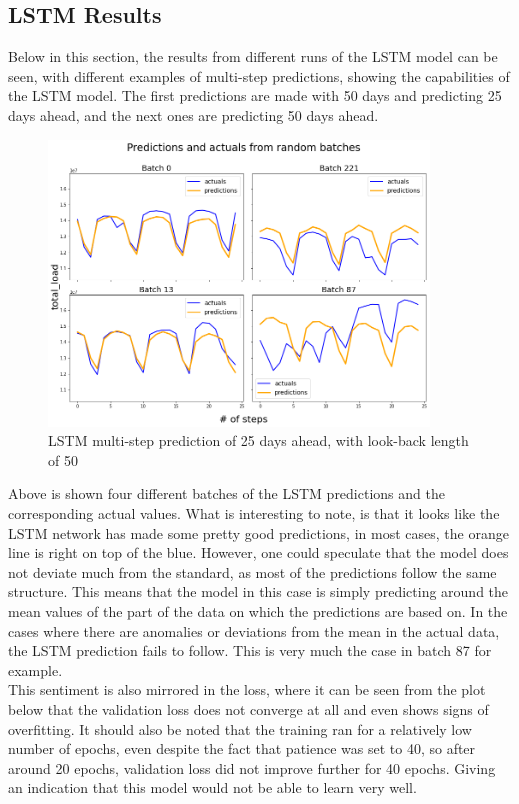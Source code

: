 \documentclass[main.tex]{subfiles}
\begin{document}
\subsection{LSTM Results}
Below in this section, the results from different runs of the LSTM model can be seen, with different examples of multi-step predictions, showing the capabilities of the LSTM model. The first predictions are made with 50 days and predicting 25 days ahead, and the next ones are predicting 50 days ahead.

\begin{figure}[H]
\centering
\includegraphics[width=0.9\textwidth]{RNNPlots/lstmpredictionsgood.png}
\caption{LSTM multi-step prediction of 25 days ahead, with look-back length of 50}
\label{fig:lstm_preds_1}
\end{figure}

Above is shown four different batches of the LSTM predictions and the corresponding actual values. What is interesting to note, is that it looks like the LSTM network has made some pretty good predictions, in most cases, the orange line is right on top of the blue. However, one could speculate that the model does not deviate much from the standard, as most of the predictions follow the same structure. This means that the model in this case is simply predicting around the mean values of the part of the data on which the predictions are based on. In the cases where there are anomalies or deviations from the mean in the actual data, the LSTM prediction fails to follow. This is very much the case in batch 87 for example.\\
This sentiment is also mirrored in the loss, where it can be seen from the plot below that the validation loss does not converge at all and even shows signs of overfitting. It should also be noted that the training ran for a relatively low number of epochs, even despite the fact that patience was set to 40, so after around 20 epochs, validation loss did not improve further for 40 epochs. Giving an indication that this model would not be able to learn very well.
\end{document}
